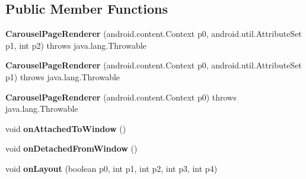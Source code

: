 \subsection*{Public Member Functions}
\begin{DoxyCompactItemize}
\item 
\mbox{\label{classmd5270abb39e60627f0f200893b490a1ade_1_1CarouselPageRenderer_a6acde7f90db116b76b108b2bd1fb0b64}} 
{\bfseries Carousel\+Page\+Renderer} (android.\+content.\+Context p0, android.\+util.\+Attribute\+Set p1, int p2)  throws java.\+lang.\+Throwable 	
\item 
\mbox{\label{classmd5270abb39e60627f0f200893b490a1ade_1_1CarouselPageRenderer_af27701b1f80e7c9f9a2d586417747524}} 
{\bfseries Carousel\+Page\+Renderer} (android.\+content.\+Context p0, android.\+util.\+Attribute\+Set p1)  throws java.\+lang.\+Throwable 	
\item 
\mbox{\label{classmd5270abb39e60627f0f200893b490a1ade_1_1CarouselPageRenderer_aa9be454657ef82dbb21b8c50844607c8}} 
{\bfseries Carousel\+Page\+Renderer} (android.\+content.\+Context p0)  throws java.\+lang.\+Throwable 	
\item 
\mbox{\label{classmd5270abb39e60627f0f200893b490a1ade_1_1CarouselPageRenderer_abd56e6e003b938a7010f08820710a67f}} 
void {\bfseries on\+Attached\+To\+Window} ()
\item 
\mbox{\label{classmd5270abb39e60627f0f200893b490a1ade_1_1CarouselPageRenderer_a5f3c611e0c723d2ad1f8b55091798202}} 
void {\bfseries on\+Detached\+From\+Window} ()
\item 
\mbox{\label{classmd5270abb39e60627f0f200893b490a1ade_1_1CarouselPageRenderer_a078976cb18c541b71fc96248ccd767e6}} 
void {\bfseries on\+Layout} (boolean p0, int p1, int p2, int p3, int p4)
\item 
\mbox{\label{classmd5270abb39e60627f0f200893b490a1ade_1_1CarouselPageRenderer_a99b77538c0fbbfb488645c55e676c438}} 

\end{DoxyCompactItemize}
